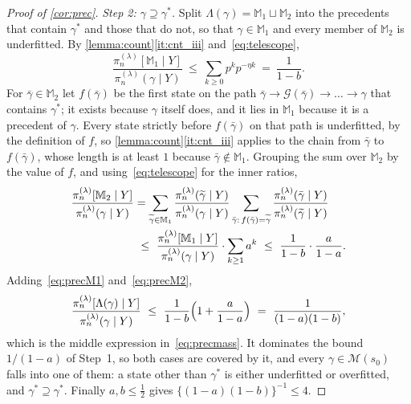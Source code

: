 \begin{proof}[Proof of \cref{cor:prec}]
    \emph{Step 2: $\gamma\supseteq\gamma^{\ast}$.} Split
    $\Lambda(\gamma)=\mathbb{M}_1\sqcup\mathbb{M}_2$ into the precedents
    that contain $\gamma^{\ast}$ and those that do not, so that
    $\gamma\in\mathbb{M}_1$ and every member of $\mathbb{M}_2$ is
    underfitted. By \cref{lemma:count}\ref{it:cnt_iii}
    and~\eqref{eq:telescope},
    \begin{equation}
        \label{eq:precM1}
        \frac{\pi_n^{(\lambda)}[\mathbb{M}_1\mid Y]}
        {\pi_n^{(\lambda)}(\gamma\mid Y)}
        \ \leq\ \sum_{k\geq0}p^{k}p^{-\eta k}\ =\ \frac{1}{1-b} .
    \end{equation}
    For $\bar\gamma\in\mathbb{M}_2$ let $f(\bar\gamma)$ be the first
    state on the path
    $\bar\gamma\to\mathcal{G}(\bar\gamma)\to\dots\to\gamma$ that contains
    $\gamma^{\ast}$; it exists because $\gamma$ itself does, and it lies
    in $\mathbb{M}_1$ because it is a precedent of $\gamma$. Every state
    strictly before $f(\bar\gamma)$ on that path is underfitted, by the
    definition of $f$, so \cref{lemma:count}\ref{it:cnt_iii} applies to
    the chain from $\bar\gamma$ to $f(\bar\gamma)$, whose length is at
    least $1$ because $\bar\gamma\notin\mathbb{M}_1$. Grouping the sum
    over $\mathbb{M}_2$ by the value of $f$, and
    using~\eqref{eq:telescope} for the inner ratios,
    \begin{align}
        \notag
        \frac{\pi_n^{(\lambda)}[\mathbb{M}_2\mid Y]}
        {\pi_n^{(\lambda)}(\gamma\mid Y)}
        &=\sum_{\widetilde\gamma\in\mathbb{M}_1}
        \frac{\pi_n^{(\lambda)}(\widetilde\gamma\mid Y)}
        {\pi_n^{(\lambda)}(\gamma\mid Y)}
        \sum_{\bar\gamma:\,f(\bar\gamma)=\widetilde\gamma}
        \frac{\pi_n^{(\lambda)}(\bar\gamma\mid Y)}
        {\pi_n^{(\lambda)}(\widetilde\gamma\mid Y)}\\
        \label{eq:precM2}
        &\ \leq\ \frac{\pi_n^{(\lambda)}[\mathbb{M}_1\mid Y]}
        {\pi_n^{(\lambda)}(\gamma\mid Y)}
        \cdot\sum_{k\geq1}a^{k}
        \ \leq\ \frac{1}{1-b}\cdot\frac{a}{1-a} .
    \end{align}
    Adding~\eqref{eq:precM1} and~\eqref{eq:precM2},
    \begin{equation*}
        \frac{\pi_n^{(\lambda)}[\Lambda(\gamma)\mid Y]}
        {\pi_n^{(\lambda)}(\gamma\mid Y)}
        \ \leq\ \frac{1}{1-b}\Bigl(1+\frac{a}{1-a}\Bigr)
        \ =\ \frac{1}{(1-a)(1-b)} ,
    \end{equation*}
    which is the middle expression in~\eqref{eq:precmass}. It dominates
    the bound $1/(1-a)$ of Step~1, so both cases are covered by it, and
    every $\gamma\in\mathscr{M}(s_0)$ falls into one of them: a state
    other than $\gamma^{\ast}$ is either underfitted or overfitted, and
    $\gamma^{\ast}\supseteq\gamma^{\ast}$. Finally $a,b\leq\tfrac12$
    gives $\{(1-a)(1-b)\}^{-1}\leq4$.
\end{proof}

